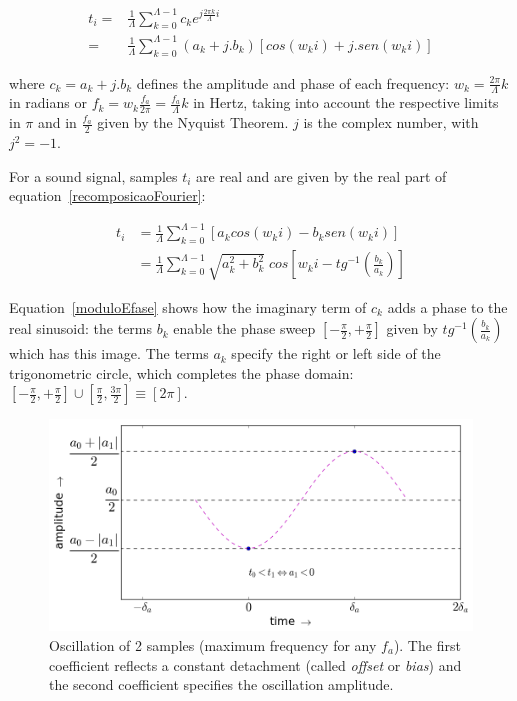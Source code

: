 \begin{equation}\label{recomposicaoFourier}
\begin{split}
t_i = & \frac{1}{\Lambda}\sum_{k=0}^{\Lambda-1}c_ke^{j \frac{2\pi k}{\Lambda} i } \\ 
    = & \frac{1}{\Lambda}\sum_{k=0}^{\Lambda-1}(a_k+ j . b_k)\left[cos(w_k i)   +j . sen(w_k i)\right]
\end{split}
\end{equation}

\noindent where $c_k = a_k + j . b_k$ defines the amplitude and phase of each frequency: $w_k=\frac{2\pi}{\Lambda}k$ in radians or $f_k=w_k\frac{f_a}{2\pi}=\frac{f_a}{\Lambda}k$ in Hertz, taking into account the respective limits in $\pi$ and in $\frac{f_a}{2}$ given by the Nyquist Theorem. $j$ is the complex number, with $j^2=-1$.

For a sound signal, samples $t_i$ are real and are given by the real part of equation~\ref{recomposicaoFourier}:

\begin{equation}\label{moduloEfase}
\begin{split}
t_i& = \frac{1}{\Lambda}\sum_{k=0}^{\Lambda-1}\left[a_k cos(w_k i) -b_k sen(w_k i)\right] \\
   & = \frac{1}{\Lambda}\sum_{k=0}^{\Lambda-1}\sqrt{a_k^2 + b_k^2} \; cos\left[w_k i - tg^{-1}\left(\frac{b_k}{a_k}\right)\right]
\end{split}
\end{equation}

Equation~\ref{moduloEfase} shows how the imaginary term of $c_k$ adds a phase to the real sinusoid: the terms $b_k$ enable the phase sweep $\left[-\frac{\pi}{2},+\frac{\pi}{2}\right]$ given by $tg^{-1}\left(\frac{b_k}{a_k}\right)$ which has this image. The terms $a_k$ specify the right or left side of the trigonometric circle, which completes the phase domain: $\left[-\frac{\pi}{2},+\frac{\pi}{2}\right] \cup \left[\frac{\pi}{2},\frac{3\pi}{2}\right]\equiv [2\pi]$.

 \begin{figure}
     \centering
         \includegraphics[width=.7\textwidth]{figures/amostras2c___}
     \caption{Oscillation of 2 samples (maximum frequency for any $f_a$). The first coefficient reflects a constant detachment (called \emph{offset} or \emph{bias}) and the second coefficient specifies the oscillation amplitude.}
         \label{fig:amostras2}
 \end{figure}

